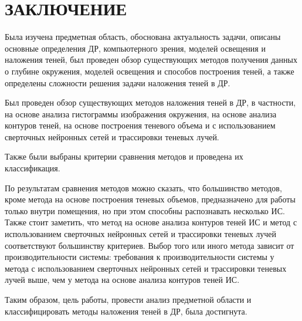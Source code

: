 \chapter*{ЗАКЛЮЧЕНИЕ}

Была изучена предметная область, обоснована актуальность задачи, описаны основные определения ДР, компьютерного зрения, моделей освещения и наложения теней, был проведен обзор существующих методов получения данных о глубине окружения, моделей освещения и способов построения теней, а также определены сложности решения задачи наложения теней в ДР.

Был проведен обзор существующих методов наложения теней в ДР, в частности, на основе анализа гистограммы изображения окружения, на основе анализа контуров теней, на основе построения теневого объема и с использованием сверточных нейронных сетей и трассировки теневых лучей.

Также были выбраны критерии сравнения методов и проведена их классификация.

По результатам сравнения методов можно сказать, что большинство методов, кроме метода на основе построения теневых объемов, предназначено для работы только внутри помещения, но при этом способны распознавать несколько ИС. Также стоит заметить, что метод на основе анализа контуров теней ИС и метод с использованием сверточных нейронных сетей и трассировки теневых лучей соответствуют большинству критериев. Выбор того или иного метода зависит от производительности системы: требования к производительности системы у метода с использованием сверточных нейронных сетей и трассировки теневых лучей выше, чем у метода на основе анализа контуров теней ИС.

Таким образом, цель работы, провести анализ предметной области и классифицировать методы наложения теней в ДР, была достигнута.